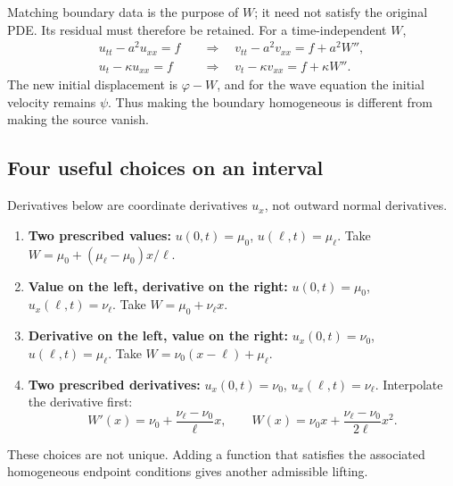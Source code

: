 \documentclass[11pt,a4paper]{article}
\begin{document}
\begin{center}
\end{center}
Matching boundary data is the purpose of $W$; it need not satisfy the original
PDE. Its residual must therefore be retained. For a time-independent $W$,
\begin{align}
 u_{tt}-a^2u_{xx}=f\quad&\Longrightarrow\quad
 v_{tt}-a^2v_{xx}=f+a^2W'',\\
 u_t-\kappa u_{xx}=f\quad&\Longrightarrow\quad
 v_t-\kappa v_{xx}=f+\kappa W''.
\end{align}
The new initial displacement is $\varphi-W$, and for the wave equation the
initial velocity remains $\psi$. Thus making the boundary homogeneous is
different from making the source vanish.

\subsection{Four useful choices on an interval}
Derivatives below are coordinate derivatives $u_x$, not outward normal derivatives.
\begin{enumerate}
 \item \textbf{Two prescribed values:}
 $u(0,t)=\mu_0$, $u(\ell,t)=\mu_\ell$.
 Take $W=\mu_0+(\mu_\ell-\mu_0)x/\ell$.
 \item \textbf{Value on the left, derivative on the right:}
 $u(0,t)=\mu_0$, $u_x(\ell,t)=\nu_\ell$.
 Take $W=\mu_0+\nu_\ell x$.
 \item \textbf{Derivative on the left, value on the right:}
 $u_x(0,t)=\nu_0$, $u(\ell,t)=\mu_\ell$.
 Take $W=\nu_0(x-\ell)+\mu_\ell$.
 \item \textbf{Two prescribed derivatives:}
 $u_x(0,t)=\nu_0$, $u_x(\ell,t)=\nu_\ell$.
 Interpolate the derivative first:
 \begin{equation}
  W'(x)=\nu_0+\frac{\nu_\ell-\nu_0}{\ell}x,
  \qquad W(x)=\nu_0x+\frac{\nu_\ell-\nu_0}{2\ell}x^2.
 \end{equation}
\end{enumerate}
These choices are not unique. Adding a function that satisfies the associated
homogeneous endpoint conditions gives another admissible lifting.
\end{document}
